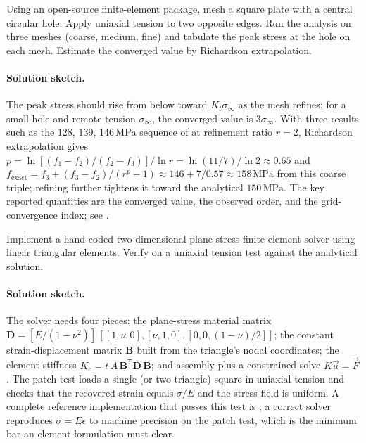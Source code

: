 \begin{exercise}
Using an open-source finite-element package, mesh a square plate
with a central circular hole. Apply uniaxial tension to two
opposite edges. Run the analysis on three meshes (coarse, medium,
fine) and tabulate the peak stress at the hole on each mesh.
Estimate the converged value by Richardson extrapolation.

\paragraph{Solution sketch.} The peak stress should rise from below
toward $K_t\sigma_\infty$ as the mesh refines; for a small hole and
remote tension $\sigma_\infty$, the converged value is $3\sigma_\infty$.
With three results such as the $128$, $139$, $146\,\text{MPa}$ sequence
of  at refinement ratio $r = 2$,
Richardson extrapolation gives $p = \ln[(f_1-f_2)/(f_2-f_3)]/\ln r =
\ln(11/7)/\ln 2 \approx 0.65$ and $f_{\text{exact}} = f_3 + (f_3-f_2)/
(r^p-1) \approx 146 + 7/0.57 \approx 158\,\text{MPa}$ from this coarse
triple; refining further tightens it toward the analytical $150\,
\text{MPa}$. The key reported quantities are the converged value, the
observed order, and the grid-convergence index; see
.
\end{exercise}

\begin{exercise}
Implement a hand-coded two-dimensional plane-stress finite-element
solver using linear triangular elements. Verify on a uniaxial
tension test against the analytical solution.

\paragraph{Solution sketch.} The solver needs four pieces: the
plane-stress material matrix $\mathbf{D} = [E/(1-\nu^2)]\,[[1,\nu,0],
[\nu,1,0],[0,0,(1-\nu)/2]]$; the constant strain-displacement matrix
$\mathbf{B}$ built from the triangle's nodal coordinates; the element
stiffness $K_e = t\,A\,\mathbf{B}^{\mathsf T}\mathbf{D}\,\mathbf{B}$;
and assembly plus a constrained solve $K\vec{u}=\vec{F}$. The patch
test loads a single (or two-triangle) square in uniaxial tension and
checks that the recovered strain equals $\sigma/E$ and the stress
field is uniform. A complete reference implementation that passes this
test is ; a correct solver reproduces $\sigma
= E\epsilon$ to machine precision on the patch test, which is the
minimum bar an element formulation must clear.
\end{exercise}

